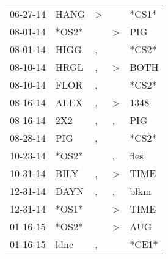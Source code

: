 \begin{supertabular}{p{0.07\textwidth}p{0.06\textwidth}p{0.02\textwidth}p{0.02\textwidth}p{0.06\textwidth}}
          06-27-14\textsuperscript{} &           HANG\textsuperscript{} &     \textgreater &                  &                            *CS1* \\
          08-01-14\textsuperscript{} &                            *OS2* &                  &     \textgreater &            PIG\textsuperscript{} \\
          08-01-14\textsuperscript{} &           HIGG\textsuperscript{} &                , &                  &                            *CS2* \\
          08-10-14\textsuperscript{} &           HRGL\textsuperscript{} &                , &     \textgreater &           BOTH\textsuperscript{} \\
          08-10-14\textsuperscript{} &           FLOR\textsuperscript{} &                , &                  &                            *CS2* \\
          08-16-14\textsuperscript{} &           ALEX\textsuperscript{} &                , &     \textgreater &           1348\textsuperscript{} \\
          08-16-14\textsuperscript{} &            2X2\textsuperscript{} &                , &                , &            PIG\textsuperscript{} \\
          08-28-14\textsuperscript{} &            PIG\textsuperscript{} &                , &                  &                            *CS2* \\
          10-23-14\textsuperscript{} &                            *OS2* &                  &                , &           fles\textsuperscript{} \\
          10-31-14\textsuperscript{} &           BILY\textsuperscript{} &                , &     \textgreater &           TIME\textsuperscript{} \\
          12-31-14\textsuperscript{} &           DAYN\textsuperscript{} &                , &                , &           blkm\textsuperscript{} \\
          12-31-14\textsuperscript{} &                            *OS1* &                  &     \textgreater &           TIME\textsuperscript{} \\
          01-16-15\textsuperscript{} &                            *OS2* &                  &     \textgreater &            AUG\textsuperscript{} \\
          01-16-15\textsuperscript{} &           ldnc\textsuperscript{} &                , &                  &                            *CE1* \\

\end{supertabular}
